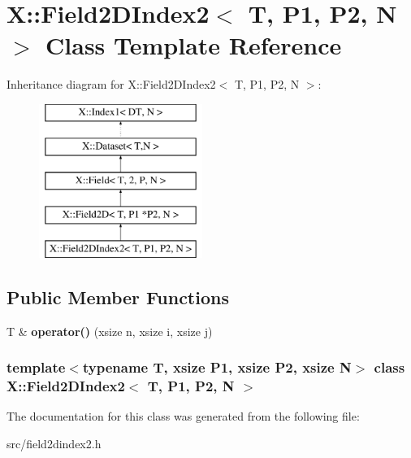 \hypertarget{class_x_1_1_field2_d_index2}{\section{X\-:\-:Field2\-D\-Index2$<$ T, P1, P2, N $>$ Class Template Reference}
\label{class_x_1_1_field2_d_index2}
}
Inheritance diagram for X\-:\-:Field2\-D\-Index2$<$ T, P1, P2, N $>$\-:\begin{figure}[H]
\begin{center}
\leavevmode
\includegraphics[height=5.000000cm]{class_x_1_1_field2_d_index2}
\end{center}
\end{figure}
\subsection*{Public Member Functions}
\begin{DoxyCompactItemize}
\item 
\hypertarget{class_x_1_1_field2_d_index2_a30fbc232fc63fe00db749020e19e1230}{T \& {\bfseries operator()} (xsize n, xsize i, xsize j)}\label{class_x_1_1_field2_d_index2_a30fbc232fc63fe00db749020e19e1230}

\end{DoxyCompactItemize}
\subsubsection*{template$<$typename T, xsize P1, xsize P2, xsize N$>$ class X\-::\-Field2\-D\-Index2$<$ T, P1, P2, N $>$}



The documentation for this class was generated from the following file\-:\begin{DoxyCompactItemize}
\item 
src/field2dindex2.\-h\end{DoxyCompactItemize}
